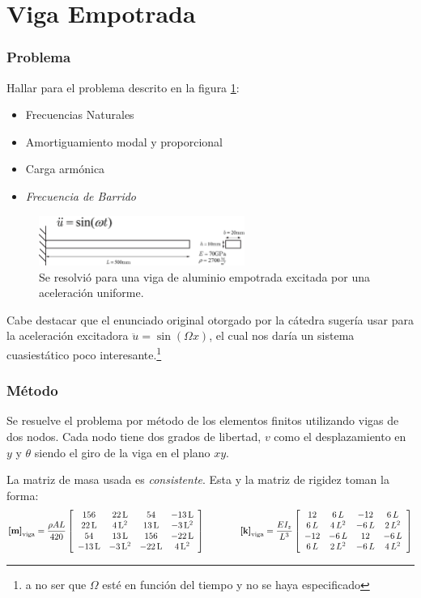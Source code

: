 \documentclass[onecolumn,10pt,titlepage,a4paper]{article}
\begin{document}
\clearpage
\part{Viga Empotrada}

\setcounter{section}{0}
\section{Problema}
Hallar para el problema descrito en la figura \ref{fig:enunciado}:
\begin{itemize}
	\item Frecuencias Naturales
	\item Amortiguamiento modal y proporcional
	\item Carga armónica
	\item \textit{Frecuencia de Barrido}
\end{itemize}

\begin{figure}[htb!]
	\centering
	\includegraphics[width=0.6\textwidth]{fig/enunciado.eps}
	\caption{Se resolvió para una viga de aluminio empotrada excitada por una aceleración uniforme.}\label{fig:enunciado}
\end{figure}
Cabe destacar que el enunciado original otorgado por la cátedra sugería usar para la aceleración excitadora $\ddot{u}=\sin (\Omega x)$, el cual nos daría un sistema cuasiestático poco interesante.\footnote{a no ser que $\Omega$ esté en función del tiempo y no se haya especificado}

\section{Método}
Se resuelve el problema por método de los elementos finitos utilizando vigas de dos nodos. Cada nodo tiene dos grados de libertad, $v$ como el desplazamiento en $y$ y $\theta$ siendo el giro de la viga en el plano $x\!y$.

La matriz de masa usada es \textit{consistente}. Esta y la matriz de rigidez toman la forma: \cite[p.379]{cook2007concepts}
\[
\boldsymbol{[}\mathbf{m} \boldsymbol{]}_{\mathrm{viga}}=\frac{\rho A L}{420}\left[\begin{array}{cccc} 156 & 22\,\mathrm{L} & 54 & -13\,\mathrm{L}\\ 22\,\mathrm{L} & 4\,{\mathrm{L}}^2 & 13\,\mathrm{L} & -3\,{\mathrm{L}}^2\\ 54 & 13\,\mathrm{L} & 156 & -22\,\mathrm{L}\\ -13\,\mathrm{L} & -3\,{\mathrm{L}}^2 & -22\,\mathrm{L} & 4\,{\mathrm{L}}^2 \end{array}\right] \qquad \qquad \boldsymbol{[}\mathbf{k} \boldsymbol{]}_{\mathrm{viga}}=\frac{E I_z}{L^3} \left[\begin{array}{cccc} 12 & 6\,L & -12 & 6\,L\\ 6\,L & 4\,L^2 & -6\,L & 2\,L^2\\ -12 & -6\,L & 12 & -6\,L\\ 6\,L & 2\,L^2 & -6\,L & 4\,L^2 \end{array}\right]
\]
\end{document}

